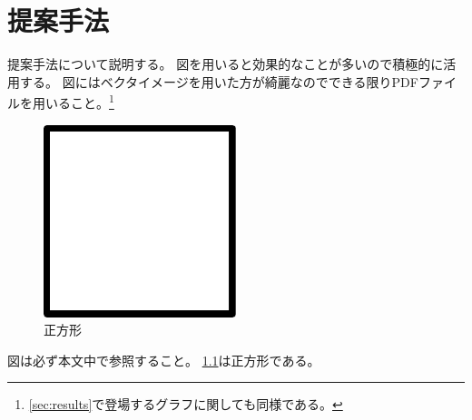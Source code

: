 \chapter{提案手法}\label{ch:proposedsytem}

提案手法について説明する。
図を用いると効果的なことが多いので積極的に活用する。
図にはベクタイメージを用いた方が綺麗なのでできる限りPDFファイルを用いること。\footnote{\cref{sec:results}で登場するグラフに関しても同様である。}

\begin{figure}[ht]
  \centering
  \includegraphics[width=0.5\textwidth]{examples/figures/square}
  \caption{正方形}\label{fig:square}
\end{figure}

図は必ず本文中で参照すること。
\cref{fig:square}は正方形である。

